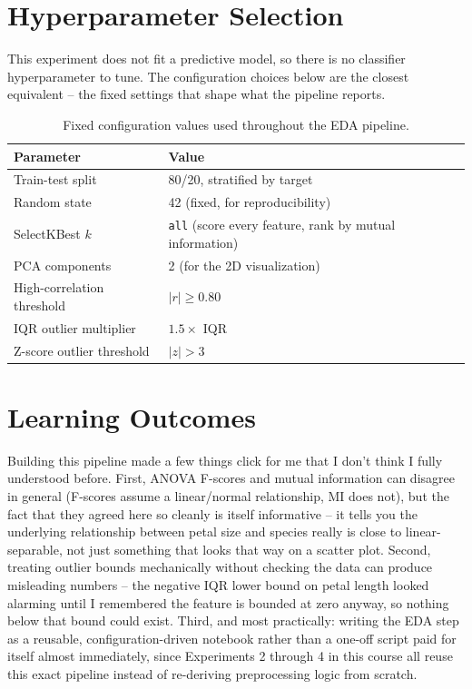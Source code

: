 \documentclass[11pt,a4paper]{article}
\begin{document}
\section{Hyperparameter Selection}
This experiment does not fit a predictive model, so there is no classifier hyperparameter to tune. The configuration choices below are the closest equivalent -- the fixed settings that shape what the pipeline reports.
\begin{table}[h]
\centering
\begin{tabular}{ll}
\toprule
Parameter & Value \\
\midrule
Train-test split & 80/20, stratified by target \\
Random state & 42 (fixed, for reproducibility) \\
SelectKBest $k$ & \texttt{all} (score every feature, rank by mutual information) \\
PCA components & 2 (for the 2D visualization) \\
High-correlation threshold & $|r| \geq 0.80$ \\
IQR outlier multiplier & $1.5 \times$ IQR \\
Z-score outlier threshold & $|z| > 3$ \\
\bottomrule
\end{tabular}
\caption{Fixed configuration values used throughout the EDA pipeline.}
\end{table}

\section{Learning Outcomes}
Building this pipeline made a few things click for me that I don't think I fully understood before. First, ANOVA F-scores and mutual information can disagree in general (F-scores assume a linear/normal relationship, MI does not), but the fact that they agreed here so cleanly is itself informative -- it tells you the underlying relationship between petal size and species really is close to linear-separable, not just something that looks that way on a scatter plot. Second, treating outlier bounds mechanically without checking the data can produce misleading numbers -- the negative IQR lower bound on petal length looked alarming until I remembered the feature is bounded at zero anyway, so nothing below that bound could exist. Third, and most practically: writing the EDA step as a reusable, configuration-driven notebook rather than a one-off script paid for itself almost immediately, since Experiments 2 through 4 in this course all reuse this exact pipeline instead of re-deriving preprocessing logic from scratch.
\end{document}

